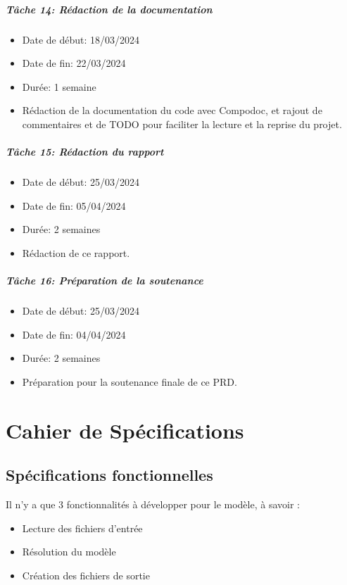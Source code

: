 \documentclass{polytech/polytech}
\numberwithin{figure}{chapter}
\begin{document}
\begin{appendix}
\paragraph{Tâche 14: Rédaction de la documentation}

\begin{itemize}
    \item Date de début: 18/03/2024
    \item Date de fin: 22/03/2024
    \item Durée: 1 semaine
    \item
        Rédaction de la documentation du code avec Compodoc, et rajout de commentaires et de TODO pour faciliter la lecture et la reprise du projet.
\end{itemize}

\paragraph{Tâche 15: Rédaction du rapport}

\begin{itemize}
    \item Date de début: 25/03/2024
    \item Date de fin: 05/04/2024
    \item Durée: 2 semaines
    \item
        Rédaction de ce rapport.
\end{itemize}

\paragraph{Tâche 16: Préparation de la soutenance}

\begin{itemize}
    \item Date de début: 25/03/2024
    \item Date de fin: 04/04/2024
    \item Durée: 2 semaines
    \item
        Préparation pour la soutenance finale de ce PRD.
\end{itemize}

\chapter{Cahier de Spécifications}

\section{Spécifications fonctionnelles}
Il n'y a que 3 fonctionnalités à développer pour le modèle, à savoir : 
\begin{itemize}
    \item Lecture des fichiers d'entrée
    \item Résolution du modèle
    \item Création des fichiers de sortie
\end{itemize}


\end{appendix}
\end{document}
